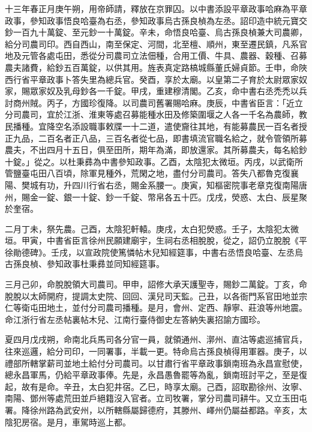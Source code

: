 
\begin{pinyinscope}

 十三年春正月庚午朔，用帝師請，釋放在京罪囚。以中書添設平章政事哈麻為平章政事，參知政事悟良哈臺為右丞，參知政事烏古孫良楨為左丞。詔印造中統元寶交鈔一百九十萬錠、至元鈔一十萬錠。辛未，命悟良哈臺、烏古孫良楨兼大司農卿，給分司農司印。西自西山，南至保定、河間，北至檀、順州，東至遷民鎮，凡系官地及元管各處屯田，悉從分司農司立法佃種，合用工價、牛具、農器、穀種、召募農夫諸費，給鈔五百萬錠，以供其用。旌表真定路槁城縣董氏婦貞節。壬申，命陜西行省平章政事卜答失里為總兵官。癸酉，享於太廟。以皇第二子育於太尉眾家奴家，賜眾家奴及乳母鈔各一千錠。甲戌，重建穆清閣。乙亥，命中書右丞禿禿以兵討商州賊。丙子，方國珍復降。以司農司舊署賜哈麻。庚辰，中書省臣言：「近立分司農司，宜於江浙、淮東等處召募能種水田及修築圍堰之人各一千名為農師，教民播種。宜降空名添設職事敕牒一十二道，遣使齎往其地，有能募農民一百名者授正九品，二百名者正八品，三百名者從七品，即書填流官職名給之，就令管領所募農夫，不出四月十五日，俱至田所，期年為滿，即放還家。其所募農夫，每名給鈔十錠。」從之。以杜秉彞為中書參知政事。乙酉，太陰犯太微垣。丙戌，以武衛所管鹽臺屯田八百頃，除軍見種外，荒閑之地，盡付分司農司。答失八都魯克復襄陽、樊城有功，升四川行省右丞，賜金系腰一。庚寅，知樞密院事老章克復南陽唐州，賜金一錠、銀一十錠、鈔一千錠、幣帛各五十匹。戊戌，熒惑、太白、辰星聚於奎宿。



 二月丁未，祭先農。己酉，太陰犯軒轅。庚戌，太白犯熒惑。壬子，太陰犯太微垣。甲寅，中書省臣言徐州民願建廟宇，生祠右丞相脫脫，從之，詔仍立脫脫《平徐勛德碑》。壬戌，以宣政院使篤憐帖木兒知經筵事，中書右丞悟良哈臺、左丞烏古孫良楨、參知政事杜秉彞並同知經筵事。



 三月己卯，命脫脫領大司農司。甲申，詔修大承天護聖寺，賜鈔二萬錠。丁亥，命脫脫以太師開府，提調太史院、回回、漢兒司天監。己丑，以各衙門系官田地並宗仁等衛屯田地土，並付分司農司播種。是月，會州、定西、靜寧、莊浪等州地震。命江浙行省左丞帖裏帖木兒、江南行臺侍御史左答納失裏招諭方國珍。



 夏四月戊戌朔，命南北兵馬司各分官一員，就領通州、漷州、直沽等處巡捕官兵，往來巡邏，給分司印，一同署事，半載一更。特命烏古孫良楨得用軍器。庚子，以禮部所轄掌薪司並地土給付分司農司。以甘肅行省平章政事鎖南班為永昌宣慰使，總永昌軍馬，仍給平章政事俸。先是，永昌愚魯罷等為亂，鎖南班討平之，至是復起，故有是命。辛丑，太白犯井宿。乙巳，時享太廟。己酉，詔取勘徐州、汝寧、南陽、鄧州等處荒田並戶絕籍沒入官者。立司牧署，掌分司農司耕牛。又立玉田屯署。降徐州路為武安州，以所轄縣屬歸德府，其滕州、嶧州仍屬益都路。辛亥，太陰犯房宿。是月，車駕時巡上都。




\end{pinyinscope}
